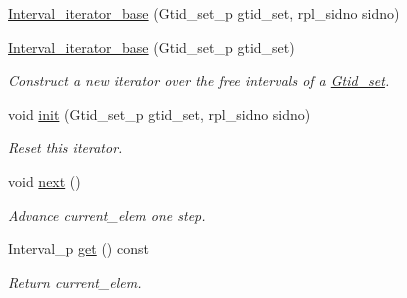 \begin{DoxyCompactItemize}
\item 
\mbox{\hyperlink{classGtid__set_1_1Interval__iterator__base_a679998deae5692929946999547b888fc}{Interval\+\_\+iterator\+\_\+base}} (Gtid\+\_\+set\+\_\+p gtid\+\_\+set, rpl\+\_\+sidno sidno)
\item 
\mbox{\label{classGtid__set_1_1Interval__iterator__base_ab899a786a5ad507a69d0e33ea8866bc9}} 
\mbox{\hyperlink{classGtid__set_1_1Interval__iterator__base_ab899a786a5ad507a69d0e33ea8866bc9}{Interval\+\_\+iterator\+\_\+base}} (Gtid\+\_\+set\+\_\+p gtid\+\_\+set)
\begin{DoxyCompactList}\small\item\em Construct a new iterator over the free intervals of a \mbox{\hyperlink{classGtid__set}{Gtid\+\_\+set}}. \end{DoxyCompactList}\item 
\mbox{\label{classGtid__set_1_1Interval__iterator__base_a08de43d5f9a6fcd8b02a9e0267b62c25}} 
void \mbox{\hyperlink{classGtid__set_1_1Interval__iterator__base_a08de43d5f9a6fcd8b02a9e0267b62c25}{init}} (Gtid\+\_\+set\+\_\+p gtid\+\_\+set, rpl\+\_\+sidno sidno)
\begin{DoxyCompactList}\small\item\em Reset this iterator. \end{DoxyCompactList}\item 
\mbox{\label{classGtid__set_1_1Interval__iterator__base_abd5cb3d9c3d4612a6cc8b72c97bec510}} 
void \mbox{\hyperlink{classGtid__set_1_1Interval__iterator__base_abd5cb3d9c3d4612a6cc8b72c97bec510}{next}} ()
\begin{DoxyCompactList}\small\item\em Advance current\+\_\+elem one step. \end{DoxyCompactList}\item 
\mbox{\label{classGtid__set_1_1Interval__iterator__base_a047f4d745b941f3cb44d9fb18cd1def2}} 
Interval\+\_\+p \mbox{\hyperlink{classGtid__set_1_1Interval__iterator__base_a047f4d745b941f3cb44d9fb18cd1def2}{get}} () const
\begin{DoxyCompactList}\small\item\em Return current\+\_\+elem. \end{DoxyCompactList}\end{DoxyCompactItemize}
